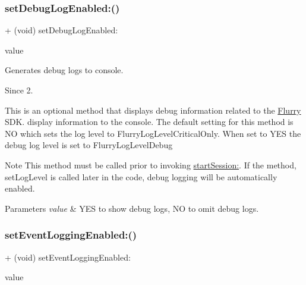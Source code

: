 \subsubsection{\texorpdfstring{set\+Debug\+Log\+Enabled\+:()}{setDebugLogEnabled:()}}
{\footnotesize\ttfamily + (void) set\+Debug\+Log\+Enabled\+: \begin{DoxyParamCaption}\item[{(B\+O\+OL)}]{value }\end{DoxyParamCaption}}



Generates debug logs to console. 

\begin{DoxySince}{Since}
2.
\end{DoxySince}
This is an optional method that displays debug information related to the \hyperlink{interfaceFlurry}{Flurry} S\+DK. display information to the console. The default setting for this method is {\ttfamily NO} which sets the log level to {\ttfamily Flurry\+Log\+Level\+Critical\+Only}. When set to {\ttfamily Y\+ES} the debug log level is set to {\ttfamily Flurry\+Log\+Level\+Debug} 

\begin{DoxyNote}{Note}
This method must be called prior to invoking \hyperlink{interfaceFlurry_aeadfa23545c392ffd46db448b6a95809}{start\+Session\+:}. If the method, set\+Log\+Level is called later in the code, debug logging will be automatically enabled.
\end{DoxyNote}

\begin{DoxyParams}{Parameters}
{\em value} & {\ttfamily Y\+ES} to show debug logs, {\ttfamily NO} to omit debug logs. \\
\hline
\end{DoxyParams}
\mbox{\label{interfaceFlurry_a75fc84e73c7e2d703311991508379407}} 
\subsubsection{\texorpdfstring{set\+Event\+Logging\+Enabled\+:()}{setEventLoggingEnabled:()}}
{\footnotesize\ttfamily + (void) set\+Event\+Logging\+Enabled\+: \begin{DoxyParamCaption}\item[{(B\+O\+OL)}]{value }\end{DoxyParamCaption}}



